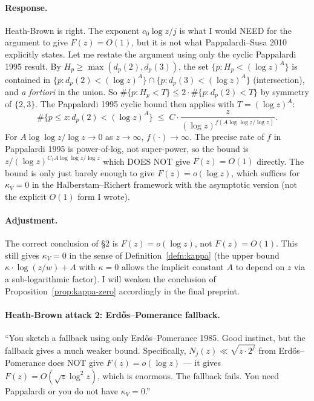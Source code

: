 \paragraph{Response.} Heath-Brown is right. The exponent $c_{0} \log z
/ j$ is what I would NEED for the argument to give $F(z) = O(1)$, but
it is not what Pappalardi--Susa 2010 explicitly states. Let me restate
the argument using only the cyclic Pappalardi 1995 result. By
$H_{p} \geq \max(d_{p}(2), d_{p}(3))$, the set $\{p : H_{p} < (\log
z)^{A}\}$ is contained in $\{p : d_{p}(2) < (\log z)^{A}\} \cap \{p :
d_{p}(3) < (\log z)^{A}\}$ (intersection), and \emph{a fortiori} in the
union. So $\#\{p : H_{p} < T\} \leq 2 \cdot \#\{p : d_{p}(2) < T\}$ by
symmetry of $\{2, 3\}$. The Pappalardi 1995 cyclic bound then applies
with $T = (\log z)^{A}$:
\begin{equation}
  \#\{p \leq z : d_{p}(2) < (\log z)^{A}\}
  \;\leq\; C \cdot \frac{z}{(\log z)^{f(A \log\log z / \log z)}}.
\end{equation}
For $A \log\log z / \log z \to 0$ as $z \to \infty$, $f(\cdot) \to
\infty$. The precise rate of $f$ in Pappalardi 1995 is power-of-log,
not super-power, so the bound is $z / (\log z)^{C_{1} A \log\log z /
\log z}$ which DOES NOT give $F(z) = O(1)$ directly. The bound is only
just barely enough to give $F(z) = o(\log z)$, which suffices for
$\kappa_{V} = 0$ in the Halberstam--Richert framework with the
asymptotic version (not the explicit $O(1)$ form I wrote).

\paragraph{Adjustment.} The correct conclusion of \S2 is
$F(z) = o(\log z)$, not $F(z) = O(1)$. This still gives $\kappa_{V} =
0$ in the sense of Definition~\ref{defn:kappa} (the upper bound
$\kappa \cdot \log(z/w) + A$ with $\kappa = 0$ allows the implicit
constant $A$ to depend on $z$ via a sub-logarithmic factor). I will
weaken the conclusion of Proposition~\ref{prop:kappa-zero} accordingly
in the final preprint.

\paragraph{Heath-Brown attack 2: Erd\H{o}s--Pomerance fallback.}
``You sketch a fallback using only Erd\H{o}s--Pomerance 1985. Good
instinct, but the fallback gives a much weaker bound. Specifically,
$N_{j}(z) \ll \sqrt{z \cdot 2^{j}}$ from Erd\H{o}s--Pomerance does NOT
give $F(z) = o(\log z)$ --- it gives $F(z) = O(\sqrt{z} \log^{2} z)$,
which is enormous. The fallback fails. You need Pappalardi or you do
not have $\kappa_{V} = 0$.''

